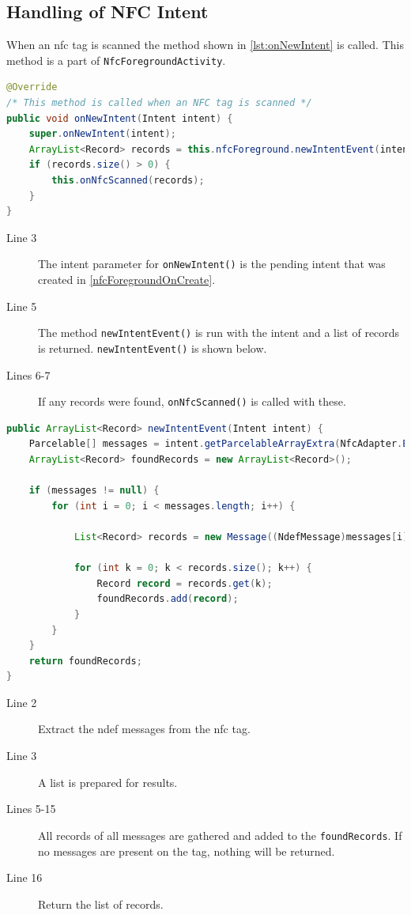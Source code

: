 \subsection*{Handling of NFC Intent}
When an \ac{nfc} tag is scanned the method shown in \autoref{lst:onNewIntent} is called. This method is a part of \lstinline|NfcForegroundActivity|.
\begin{lstlisting}[language=java, label=lst:onNewIntent, caption=\lstinline|onNewIntent()| method]
@Override
/* This method is called when an NFC tag is scanned */
public void onNewIntent(Intent intent) { 
    super.onNewIntent(intent);
    ArrayList<Record> records = this.nfcForeground.newIntentEvent(intent);
    if (records.size() > 0) {
        this.onNfcScanned(records);
    }
}  
\end{lstlisting}
\begin{description}
\item[Line 3] The intent parameter for \lstinline|onNewIntent()| is the pending intent that was created in \autoref{nfcForegroundOnCreate}.
\item[Line 5] The method \lstinline|newIntentEvent()| is run with the intent and a list of records is returned. \lstinline|newIntentEvent()| is shown below.
\item[Lines 6-7] If any records were found, \lstinline|onNfcScanned()| is called with these.
\end{description}

\begin{lstlisting}[language=java, label=lst:newIntentEvent, caption=\lstinline|newIntentEvent| parsing to records]
public ArrayList<Record> newIntentEvent(Intent intent) {
    Parcelable[] messages = intent.getParcelableArrayExtra(NfcAdapter.EXTRA_NDEF_MESSAGES);
    ArrayList<Record> foundRecords = new ArrayList<Record>();

    if (messages != null) {
        for (int i = 0; i < messages.length; i++) {

            List<Record> records = new Message((NdefMessage)messages[i]);

            for (int k = 0; k < records.size(); k++) {
                Record record = records.get(k);
                foundRecords.add(record);
            }
        }
    }
    return foundRecords;
}
\end{lstlisting}
\begin{description}
\item[Line 2] Extract the \ac{ndef} messages from the \ac{nfc} tag.
\item[Line 3] A list is prepared for results.
\item[Lines 5-15] All records of all messages are gathered and added to the \lstinline|foundRecords|. If no messages are present on the tag, nothing will be returned.
\item[Line 16] Return the list of records.
\end{description}

